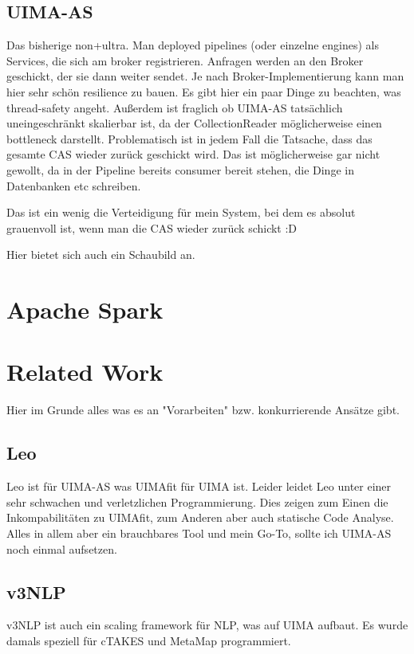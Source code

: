 \subsection{UIMA-AS}
Das bisherige non+ultra. Man deployed pipelines (oder einzelne engines) als Services, die sich am broker registrieren. Anfragen werden an den Broker geschickt, der sie dann weiter sendet. Je nach Broker-Implementierung kann man hier sehr schön resilience zu bauen. Es gibt hier ein paar Dinge zu beachten, was thread-safety angeht. Außerdem ist fraglich ob UIMA-AS tatsächlich uneingeschränkt skalierbar ist, da der CollectionReader möglicherweise einen bottleneck darstellt. Problematisch ist in jedem Fall die Tatsache, dass das gesamte CAS wieder zurück geschickt wird. Das ist möglicherweise gar nicht gewollt, da in der Pipeline bereits consumer bereit stehen, die Dinge in Datenbanken etc schreiben.

Das ist ein wenig die Verteidigung für mein System, bei dem es absolut grauenvoll ist, wenn man die CAS wieder zurück schickt :D

Hier bietet sich auch ein Schaubild an.

\section{Apache Spark}


\section{Related Work}
\label{sec:related}
Hier im Grunde alles was es an "Vorarbeiten" bzw. konkurrierende Ansätze gibt.

\subsection{Leo}
Leo ist für UIMA-AS was UIMAfit für UIMA ist. Leider leidet Leo unter einer sehr schwachen und verletzlichen Programmierung. Dies zeigen zum Einen die Inkompabilitäten zu UIMAfit, zum Anderen aber auch statische Code Analyse. Alles in allem aber ein brauchbares Tool und mein Go-To, sollte ich UIMA-AS noch einmal aufsetzen.

\subsection{v3NLP}
v3NLP ist auch ein scaling framework für NLP, was auf UIMA aufbaut. Es wurde damals speziell für cTAKES und MetaMap programmiert.


